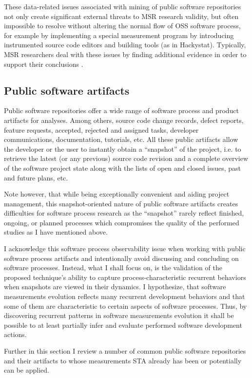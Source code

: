 These data-related issues associated with mining of public software repositories not only create significant external 
threats to MSR research validity, but often impossible to resolve without altering the normal flow of OSS software 
process, for example by implementing a special measurement program by introducing instrumented source code 
editors and building tools (as in Hackystat). 
Typically, MSR researchers deal with these issues by finding additional evidence in order to support their conclusions 
\cite{citeulike:5043664} \cite{citeulike:5128808}.

\subsection{Public software artifacts}
Public software repositories offer a wide range of software process and product artifacts for analyses.
Among others, source code change records, defect reports, feature requests, accepted, rejected and assigned tasks, 
developer communications, documentation, tutorials, etc. 
All these public artifacts allow the developer or the user to instantly obtain a ``snapshot'' of the project,  
i.e. to retrieve the latest (or any previous) source code revision and a complete overview of the software project state 
along with the lists of open and closed issues, past and future plans, etc.

Note however, that while being exceptionally convenient and aiding project management, this snapshot-oriented nature 
of public software artifacts creates difficulties for software process research as the ``snapshot'' rarely reflect finished, 
ongoing, or planned processes which compromises the quality of the performed studies as I have mentioned above. 

I acknowledge this software process observability issue when working with public software process artifacts and intentionally 
avoid discussing and concluding on software processes. Instead, what I shall focus on, is the validation of the proposed 
technique's ability to capture process-characteristic recurrent behaviors when snapshots are viewed in their dynamics. 
I hypothesize, that software measurements evolution reflects many recurrent development behaviors and that some of 
them are characteristic to certain aspects of software processes. Thus, by discovering recurrent patterns in software 
measurements evolution it shall be possible to at least partially infer and evaluate performed software development actions.

Further in this section I review a number of common public software repositories and their artifacts to whose measurements 
STA already has been or potentially can be applied. 

